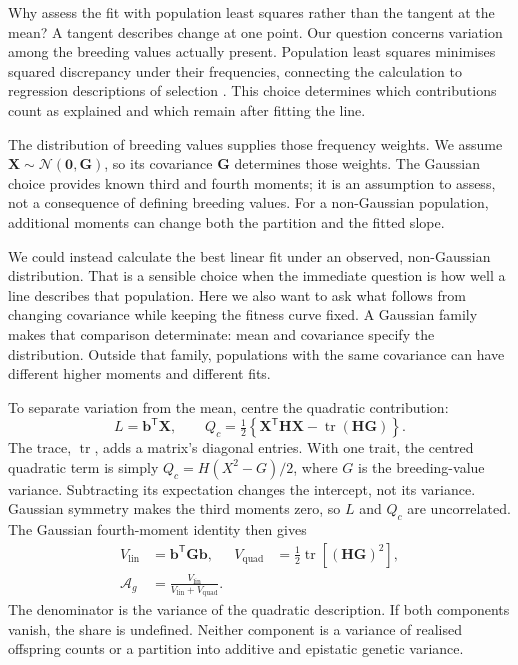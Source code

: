 Why assess the fit with population least squares rather than the tangent
at the mean? A tangent describes change at one point. Our question concerns
variation among the breeding values actually present. Population least
squares minimises squared discrepancy under their frequencies, connecting
the calculation to regression descriptions of selection
\citep{LandeArnold1983,MooradWade2013}. This choice determines which
contributions count as explained and which remain after fitting the line.

The distribution of breeding values supplies those frequency weights. We
assume $\mathbf X\sim\mathcal N(\mathbf0,\mathbf G)$, so its covariance
$\mathbf G$ determines those weights. The Gaussian choice provides known
third and fourth moments; it is an assumption to assess, not a consequence
of defining breeding values. For a non-Gaussian population, additional
moments can change both the partition and the fitted slope.

We could instead calculate the best linear fit under an observed,
non-Gaussian distribution. That is a sensible choice when the immediate
question is how well a line describes that population. Here we also want to
ask what follows from changing covariance while keeping the fitness curve
fixed. A Gaussian family makes that comparison determinate: mean and
covariance specify the distribution. Outside that family, populations with
the same covariance can have different higher moments and different fits.

To separate variation from the mean, centre the quadratic contribution:
\begin{equation}
 L=\mathbf b^{\mathsf T}\mathbf X,
 \qquad
 Q_c=\tfrac12\left\{\mathbf X^{\mathsf T}\mathbf H\mathbf X
                         -\operatorname{tr}(\mathbf H\mathbf G)\right\}.
 \label{companion:eq:centred}
\end{equation}
The trace, $\operatorname{tr}$, adds a matrix's diagonal entries. With one
trait, the centred quadratic term is simply $Q_c=H(X^2-G)/2$, where $G$ is
the breeding-value variance. Subtracting its expectation changes the
intercept, not its variance.
Gaussian symmetry makes the third moments zero, so $L$ and $Q_c$ are
uncorrelated. The Gaussian fourth-moment identity \citep{Isserlis1918}
then gives
\begin{align}
 V_{\mathrm{lin}}&=\mathbf b^{\mathsf T}\mathbf G\mathbf b,
 & V_{\mathrm{quad}}&=\tfrac12\operatorname{tr}[(\mathbf H\mathbf G)^2],
 \label{companion:eq:components}\\
 \mathcal A_g&=\frac{V_{\mathrm{lin}}}
                    {V_{\mathrm{lin}}+V_{\mathrm{quad}}}.
 \label{companion:eq:share}
\end{align}
The denominator is the variance of the quadratic description. If both
components vanish, the share is undefined. Neither component is a variance
of realised offspring counts or a partition into additive and epistatic
genetic variance.

